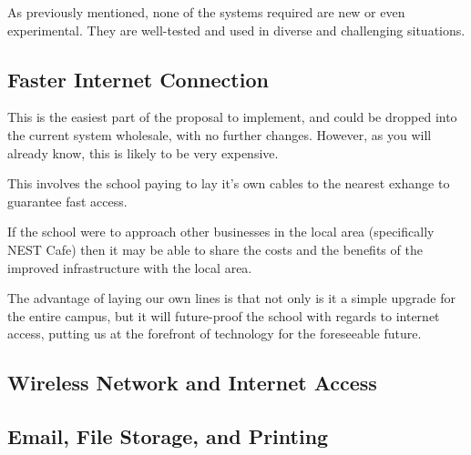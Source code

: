 \documentclass[a4paper,leqno,titlepage]{article}
\begin{document}
As previously mentioned, none of the systems required are new or even
experimental. They are well-tested and used in diverse and challenging
situations.

\subsection{Faster Internet Connection}


This is the easiest part of the proposal to implement, and could be dropped
into the current system wholesale, with no further changes. However, as you will
already know, this is likely to be very expensive.


This involves the school paying to lay it's own cables to the nearest exhange
to guarantee fast access.


If the school were to approach other businesses in the local area (specifically
NEST Cafe) then it may be able to share the costs and the benefits of the
improved infrastructure with the local area.


The advantage of laying our own lines is that not only is it a simple upgrade
for the entire campus, but it will future-proof the school with regards to
internet access, putting us at the forefront of technology for the foreseeable
future.




\subsection{Wireless Network and Internet Access}




\subsection{Email, File Storage, and Printing}


\end{document}

